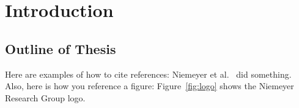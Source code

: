 
\chapter{Introduction}
\label{part:intro}



\blindtext

\section{Outline of Thesis}

Here are examples of how to cite references: Niemeyer et al.~\cite{niemeyer2010,niemeyer2011,niemeyer2014} did something.
Also, here is how you reference a figure: Figure~\ref{fig:logo} shows the Niemeyer Research Group logo.
 
